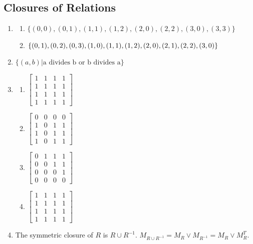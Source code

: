 \documentclass{../../cls/sig-alternate-05-2015}
\begin{document}
\subsection{Closures of Relations}
\begin{enumerate}
\item 
	\begin{enumerate}
		\item $\{(0, 0), (0, 1), (1, 1), (1, 2), (2, 0), (2, 2), (3, 0), (3, 3)\}$
		\item $\{(0, 1), (0, 2), (0, 3), (1, 0), (1, 1), (1, 2), (2, 0), (2, 1),\\
			(2, 2), (3, 0)\}$
	\end{enumerate}

\item
$\{(a, b) | \text{a divides b or b divides a}\}$	

\item
	\begin{enumerate}
		\item 
		$\begin{bmatrix}
		1 & 1 & 1 & 1\\
		1 & 1 & 1 & 1\\
		1 & 1 & 1 & 1\\
		1 & 1 & 1 & 1
		\end{bmatrix}$
		\item
		$\begin{bmatrix}
		0 & 0 & 0 & 0\\
		1 & 0 & 1 & 1\\
		1 & 0 & 1 & 1\\
		1 & 0 & 1 & 1
		\end{bmatrix}$
		\item
		$\begin{bmatrix}
		0 & 1 & 1 & 1\\
		0 & 0 & 1 & 1\\
		0 & 0 & 0 & 1\\
		0 & 0 & 0 & 0
		\end{bmatrix}$
		\item
		$\begin{bmatrix}
		1 & 1 & 1 & 1\\
		1 & 1 & 1 & 1\\
		1 & 1 & 1 & 1\\
		1 & 1 & 1 & 1
		\end{bmatrix}$		
	\end{enumerate}
	
\item The symmetric closure of $R$ is $R \cup R^{-1}$. $M_{R \cup R^{-1}} = M_R \vee M_{R^{-1}} = M_R \vee M_R^T$.


\end{enumerate}
\end{document}
